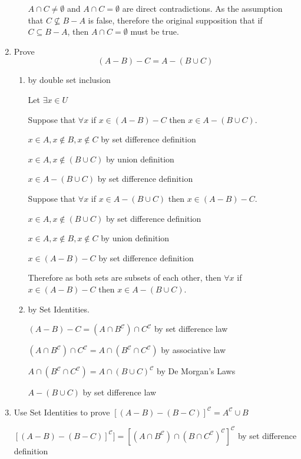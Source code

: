 \documentclass[12pt,letterpaper,titlepage]{article}
\begin{document}
\begin{raggedright}
\begin{enumerate}[resume]
\begin{enumerate}[label=(\alph*)]
$A\cap C \neq \emptyset$ and $A\cap C = \emptyset$ are direct contradictions. As the assumption that $C\not\subseteq B-A$ is false, therefore the original supposition that if $C\subseteq B-A$, then $A\cap C=\emptyset$ must be true.

\end{enumerate}


\item Prove
\begin{equation*}
(A-B)-C=A-(B\cup C)
\end{equation*}
\begin{enumerate}[label=(\alph*)]
\item by double set inclusion

Let $\exists x \in U$

Suppose that $\forall x$ if $x\in (A-B)-C$ then $x\in A-(B\cup C)$.

$x\in A, x\notin B, x\notin C$ by set difference definition

$x\in A, x\notin (B\cup C)$ by union definition

$x\in A - (B\cup C)$ by set difference definition

Suppose that $\forall x$ if $x\in A-(B\cup C)$ then $x\in (A-B)-C$.

$x\in A, x\notin (B\cup C)$ by set difference definition

$x\in A, x\notin B, x\notin C$ by union definition

$x\in (A - B) - C$ by set difference definition

Therefore as both sets are subsets of each other, then $\forall x$ if $x\in (A-B)-C$ then $x\in A-(B\cup C)$.

\item by Set Identities.

$(A-B)-C = (A\cap B^\mathcal{C})\cap C^\mathcal{C}$  by set difference law

$(A\cap B^\mathcal{C})\cap C^\mathcal{C} = A\cap (B^\mathcal{C}\cap C^\mathcal{C})$ by associative law

$A\cap (B^\mathcal{C}\cap C^\mathcal{C}) = A\cap (B\cup C)^\mathcal{C}$ by De Morgan's Laws

$A - (B\cup C)$ by set difference law


\end{enumerate}

\item Use Set Identities to prove $[(A-B)-(B-C)]^\mathcal{C}=A^\mathcal{C}\cup B$

$[(A-B)-(B-C)]^\mathcal{C}] = [(A\cap B^\mathcal{C})\cap(B\cap C^\mathcal{C})^\mathcal{C}]^\mathcal{C}$ by set difference definition


\end{enumerate}
\end{raggedright}
\end{document}
